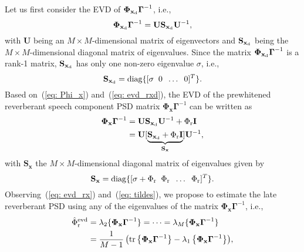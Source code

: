 \documentclass[10pt]{IEEEtran}
\begin{document}
Let us first consider the EVD of $\boldsymbol{\Phi}_{{\mathbf{x}}_{\rm d}}\boldsymbol{\Gamma}^{-1}$, i.e.,
\begin{equation}
\label{eq: evd_rxd}
\boldsymbol{\Phi}_{\mathbf{x}_{\rm d}}\boldsymbol{\Gamma}^{-1} = \mathbf{U} \mathbf{S}_{{\mathbf{x}}_{\rm d}}\mathbf{U}^{-1},
\end{equation}
with $\mathbf{U}$ being an $M \times M$-dimensional matrix of eigenvectors and $\mathbf{S}_{{\mathbf{x}}_{\rm d}}$ being the $M \times M$-dimensional diagonal matrix of eigenvalues.
Since the matrix $\boldsymbol{\Phi}_{\mathbf{x}_{\rm d}}\boldsymbol{\Gamma}^{-1}$ is a rank-1 matrix, $\mathbf{S}_{{\mathbf{x}}_{\rm d}}$ has only one non-zero eigenvalue $\sigma$, i.e., 
\begin{equation}
\label{eq: Sxd}
\mathbf{S}_{{\mathbf{x}}_{\rm d}} = {\rm diag} \{[\sigma \; \; 0 \; \; \ldots \;\; 0]^T \}.
\end{equation}
Based on~(\ref{eq: Phi_x}) and~(\ref{eq: evd_rxd}), the EVD of the prewhitened reverberant speech component PSD matrix $\boldsymbol{\Phi}_{\mathbf{x}}\boldsymbol{\Gamma}^{-1}$ can be written as
\begin{subequations}
\label{eq: evd_rx}
\begin{align}
\boldsymbol{\Phi}_{\mathbf{x}}\boldsymbol{\Gamma}^{-1}  & = \mathbf{U} \mathbf{S}_{{\mathbf{x}}_{\rm d}} \mathbf{U}^{-1} + \Phi_{\rm r}\mathbf{I} \\
& = \mathbf{U} [\underbrace{\mathbf{S}_{{\mathbf{x}}_{\rm d}} + \Phi_{\rm r}\mathbf{I}}_{\mathbf{S}_{\mathbf{x}}}]\mathbf{U}^{-1},
\end{align}
\end{subequations}
with $\mathbf{S}_{\mathbf{x}}$ the $M \times M$-dimensional diagonal matrix of eigenvalues given by
\begin{equation}
\label{eq: tildes}
\mathbf{S}_{\mathbf{x}} = {\rm diag} \{[\sigma + \Phi_{\rm r} \; \; \Phi_{\rm r} \;\; \ldots \;\; \Phi_{\rm r}]^T \}.
\end{equation}
Observing~(\ref{eq: evd_rx}) and~(\ref{eq: tildes}), we propose to estimate the late reverberant PSD using any of the eigenvalues of the matrix $\boldsymbol{\Phi}_{\mathbf{x}}\boldsymbol{\Gamma}^{-1}$, i.e.,
\begin{subequations}
\label{eq: phir_evd}
\begin{align}
\label{eq: phir_evds}
\!\!\!\hat{\Phi}^{\rm evd}_{\rm r} & = \lambda_2\{\boldsymbol{\Phi}_{\mathbf{x}}\boldsymbol{\Gamma}^{-1}\} = \cdots = \lambda_M\{\boldsymbol{\Phi}_{\mathbf{x}}\boldsymbol{\Gamma}^{-1}\} \\
\label{eq: evd_tr}
& =\frac{1}{M-1} \left( {\rm tr} \left\{ \boldsymbol{\Phi}_{\mathbf{x}}\boldsymbol{\Gamma}^{-1} \right\} - \lambda_1\left\{\boldsymbol{\Phi}_{\mathbf{x}}\boldsymbol{\Gamma}^{-1}\right\}\right)\!,\!\!\! 
\end{align}
\end{subequations}
\end{document}

